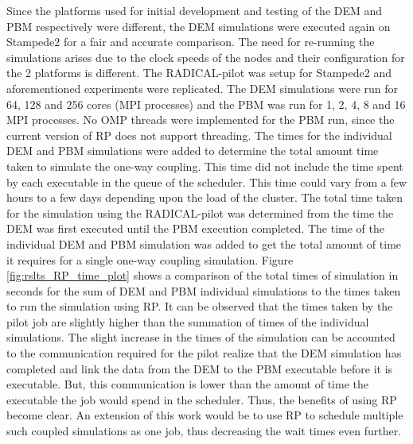 \documentclass[preprint,11pt,authoryear]{elsarticle}
\begin{document}
Since the platforms used for initial development and testing of the DEM and PBM respectively were different, 
the DEM simulations were executed again on Stampede2 for a fair and accurate comparison. The need for re-running
the simulations arises due to the clock speeds of the nodes and their configuration for the 2 platforms is different.
The RADICAL-pilot was setup for Stampede2 and aforementioned experiments were replicated. The DEM simulations were 
run for 64, 128 and 256 cores (MPI processes) and the PBM was run for 1, 2, 4, 8 and 16 MPI processes. No OMP threads 
were implemented for the PBM run, since the current version of RP does not support threading. 
 The times for the individual DEM and PBM simulations were added to determine the total amount time taken to 
simulate the one-way coupling. This time did not include the time spent by each executable in the queue of the 
scheduler. This time could vary from a few hours to a few days depending upon the load of the cluster. The total 
time taken for the simulation using the RADICAL-pilot was determined from the time the DEM was first executed until 
the PBM execution completed. The time of the individual DEM and PBM simulation was added to get the total amount of 
time it requires for a single one-way coupling simulation. Figure \ref{fig:rslts_RP_time_plot} shows a comparison of 
the total times of simulation in seconds for the sum of DEM and PBM individual simulations to the times taken to 
run the simulation using RP. It can be observed that the times taken by the pilot job are slightly higher 
than the summation of times of the individual simulations. The slight increase in the times of the simulation 
can be accounted to the communication required for the pilot realize that the DEM simulation has completed 
and link the data from the DEM to the PBM executable before it is executable. But, this communication is 
lower than the amount of time the executable the job would spend in the scheduler. Thus, the benefits of using RP become 
clear. An extension of this work would be to use RP to schedule multiple such coupled simulations as one job, thus 
decreasing the wait times even further. 
\end{document}
